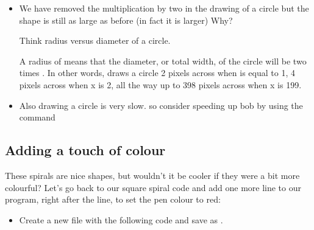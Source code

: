 \documentclass{coderdojo}
\begin{document}


\begin{itemize}
\item
We have removed the multiplication by two in the drawing of a circle but the shape is still as large as before (in fact it is larger) Why?

Think radius versus diameter of a circle.

A radius of  means that the diameter, or total width, of the circle will be two times . In other words,  draws a circle 2 pixels across when  is equal to 1, 4 pixels across when x is 2, all the way up to 398 pixels across when x is 199. 
\item
Also drawing a circle is very slow. so consider speeding up bob by using the command

\end{itemize}

\subsection{Adding a touch of colour}

These spirals are nice shapes, but wouldn't it be cooler if they were a bit more colourful? Let's go back to our square spiral code and add one more line to our program, right after the 
 line, to set the pen colour to red:

\begin{itemize}
\item[\todoSymbol] \color{todo}
Create a new file with the following code and save as .
\end{itemize}
\end{document}
